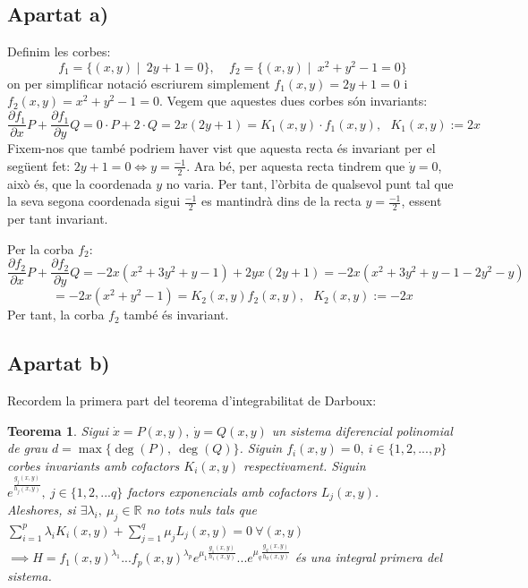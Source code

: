 \documentclass[10pt,a4paper]{article}
\newtheorem{thm}{Teorema}
\newcommand{\R}{\mathbb R}
\begin{document}
\subsection*{Apartat a)}
Definim les corbes:
$$
  f_1=\{(x,y) \mid \ 2y+1=0\}, \ \ \ \ \ f_2=\{(x,y) \mid \ x^2+y^2-1=0\}
$$
on per simplificar notació escriurem simplement $f_1(x,y)=2y+1=0$ i $f_2(x,y)=x^2+y^2-1=0$. Vegem que aquestes dues corbes són invariants:
\begin{equation}
  \frac{\partial f_1}{\partial x}P+\frac{\partial f_1}{\partial y}Q=0\cdot P+2\cdot Q=2x(2y+1)=K_1(x,y)\cdot f_1(x,y), \ \ \ K_1(x,y):=2x
\end{equation}
Fixem-nos que també podriem haver vist que aquesta recta és invariant per el següent fet: $2y+1=0 \iff y=\frac{-1}{2}$. Ara bé, per aquesta recta tindrem que $\dot{y}=0$, això és, que la coordenada $y$ no varia. Per tant, l'òrbita de qualsevol punt tal que la seva segona coordenada sigui $\frac{-1}{2}$ es mantindrà dins de la recta $y=\frac{-1}{2}$, essent per tant invariant.
\par
Per la corba $f_2$:
\begin{equation}
  \frac{\partial f_2}{\partial x}P+\frac{\partial f_2}{\partial y}Q= -2x(x^2+3y^2+y-1)+2yx(2y+1)=  -2x(x^2+3y^2+y-1-2y^2-y)
\end{equation}
$$= -2x(x^2+y^2-1)=K_2(x,y)f_2(x, y), \ \ \ K_2(x,y):=-2x$$
Per tant, la corba $f_2$ també és invariant.

\subsection*{Apartat b)}
Recordem la primera part del teorema d'integrabilitat de Darboux:
\begin{thm}
  Sigui $\dot{x}=P(x,y), \ \dot{y}=Q(x,y)$ un sistema diferencial polinomial de grau $d=\max\{\deg(P), \ \deg(Q)\}$. Siguin $f_i(x,y)=0, \ i\in\{1, 2, ..., p\}$ corbes invariants amb cofactors $K_i(x,y)$ respectivament. Siguin $e^{\frac{g_j(x,y)}{h_j(x,y)}}, \ j\in\{1, 2, ... q\}$ factors exponencials amb cofactors $L_j(x,y)$. \\
  Aleshores, si $\exists \lambda_i, \ \mu_j \in \R$ no tots nuls tals que $\sum_{i=1}^{p}\lambda_iK_i(x,y)+\sum_{j=1}^{q}\mu_jL_j(x,y)=0 \ \forall (x,y)$
  \\ $\implies H=f_1(x,y)^{\lambda_1}...f_p(x,y)^{\lambda_p}e^{\mu_1\frac{g_1(x,y)}{h_1(x,y)}}...e^{\mu_q\frac{g_q(x,y)}{h_q(x,y)}}$ és una integral primera del sistema.
\end{thm}
\end{document}
